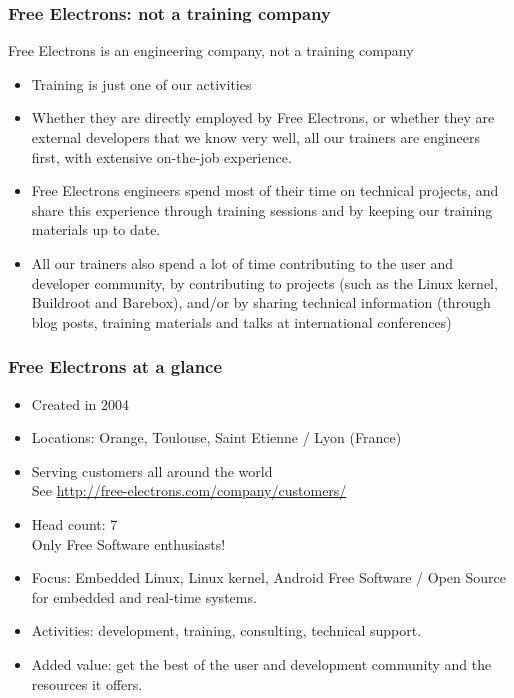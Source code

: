 \begin{frame}
\frametitle{Free Electrons: not a training company}
  Free Electrons is an engineering company, not a training company
  \begin{itemize}
    \item Training is just one of our activities
    \item Whether they are directly employed by Free Electrons, or whether
          they are external developers that we know very well, all 
          our trainers are engineers first, with extensive on-the-job
          experience.
    \item Free Electrons engineers spend most of their time on technical projects,
          and share this experience through training sessions and by
          keeping our training materials up to date.
    \item All our trainers also spend a lot of time contributing to the user
          and developer community, by contributing to projects (such as the Linux kernel,
          Buildroot and Barebox), and/or by sharing technical information (through
          blog posts, training materials and talks at international
          conferences)
  \end{itemize}
\end{frame}

\begin{frame}
\frametitle{Free Electrons at a glance}
  \begin{itemize}
    \item Created in 2004
    \item Locations: Orange, Toulouse, Saint Etienne / Lyon (France)
    \item Serving customers all around the world \\
          See \url{http://free-electrons.com/company/customers/}
    \item Head count: 7 \\
	  Only Free Software enthusiasts!
    \item Focus: Embedded Linux, Linux kernel, Android
          Free Software / Open Source
          for embedded and real-time systems.
    \item Activities: development, training, consulting, technical
          support.
    \item Added value: get the best of the user and development
          community and the resources it offers.
  \end{itemize}
\end{frame}

